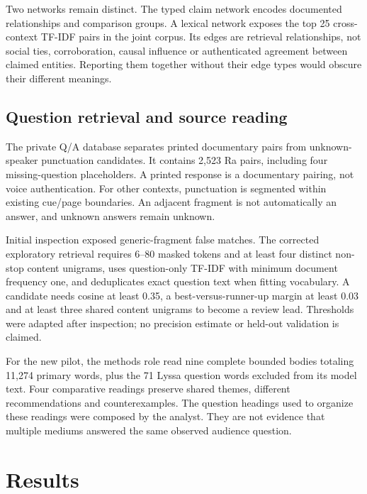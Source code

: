 \documentclass[
  11pt,
]{article}
\begin{document}
Two networks remain distinct. The typed claim network encodes documented
relationships and comparison groups. A lexical network exposes the top
25 cross-context TF-IDF pairs in the joint corpus. Its edges are
retrieval relationships, not social ties, corroboration, causal
influence or authenticated agreement between claimed entities. Reporting
them together without their edge types would obscure their different
meanings.

\FloatBarrier

\subsection{Question retrieval and source
reading}\label{question-retrieval-and-source-reading}

The private Q/A database separates printed documentary pairs from
unknown-speaker punctuation candidates. It contains 2,523 Ra pairs,
including four missing-question placeholders. A printed response is a
documentary pairing, not voice authentication. For other contexts,
punctuation is segmented within existing cue/page boundaries. An
adjacent fragment is not automatically an answer, and unknown answers
remain unknown.

Initial inspection exposed generic-fragment false matches. The corrected
exploratory retrieval requires 6--80 masked tokens and at least four
distinct non-stop content unigrams, uses question-only TF-IDF with
minimum document frequency one, and deduplicates exact question text
when fitting vocabulary. A candidate needs cosine at least 0.35, a
best-versus-runner-up margin at least 0.03 and at least three shared
content unigrams to become a review lead. Thresholds were adapted after
inspection; no precision estimate or held-out validation is claimed.

For the new pilot, the methods role read nine complete bounded bodies
totaling 11,274 primary words, plus the 71 Lyssa question words excluded
from its model text. Four comparative readings preserve shared themes,
different recommendations and counterexamples. The question headings
used to organize these readings were composed by the analyst. They are
not evidence that multiple mediums answered the same observed audience
question.

\FloatBarrier

\section{Results}\label{results}
\end{document}
